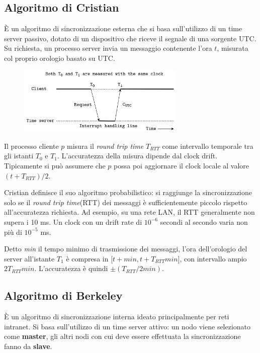 \subsection{Algoritmo di Cristian}
È un algoritmo di sincronizzazione esterna che si basa sull'utilizzo di un time server passivo, dotato di un dispositivo che riceve il segnale di una sorgente UTC. Su richiesta, un processo server invia un messaggio contenente l'ora $t$, misurata col proprio orologio basato su UTC.

\begin{figure}[ht]
    \centering
    \includegraphics[width=8cm]{./Images/cap3/3.1.png}
\end{figure}

Il processo cliente $p$ misura il \textit{round trip time} $T_{RTT}$ come intervallo temporale tra gli istanti $T_{0}$ e $T_{1}$. L'accuratezza della misura dipende dal clock drift. Tipicamente si può assumere che $p$ possa poi aggiornare il clock locale al valore $(t + T_{RTT})/2$.

\vspace{5mm}

Cristian definisce il suo algoritmo probabilistico: si raggiunge la sincronizzazione solo se il \textit{round trip time}(RTT) dei messaggi è sufficientemente piccolo rispetto all'accuratezza richiesta. Ad esempio, su una rete LAN, il RTT generalmente non supera i 10 ms. Un clock con un drift rate di $10^{-6}$ secondi al secondo varia non più di $10^{-5}$ ms.

Detto \textit{min} il tempo minimo di trasmissione dei messaggi, l'ora dell'orologio del server all'istante $T_{1}$ è compresa in [$t + min, t + T_{RTT} min$], con intervallo ampio $2 T_{RTT} min$. L'accuratezza è quindi $\pm (T_{RTT}/2 min)$.

\subsection{Algoritmo di Berkeley}
È un algoritmo di sincronizzazione interna ideato principalmente per reti intranet. Si basa sull'utilizzo di un time server attivo: un nodo viene selezionato come \textbf{master}, gli altri nodi con cui deve essere effettuata la sincronizzazione fanno da \textbf{slave}.

